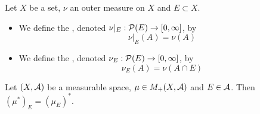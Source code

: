 \documentclass{book}
\begin{document}
	\begin{defn} 
		Let $X$ be a set, $\nu$ an outer measure on $X$ and $E \subset X$. 
		\begin{itemize}
			\item We define the , denoted $\nu|_E: \mathcal{P}(E) \rightarrow [0,\infty]$, by 
			$$\nu|_E(A) = \nu(A)$$
			\item We define the , denoted $\nu_E: \mathcal{P}(E) \rightarrow [0,\infty]$, by 
			$$\nu_E(A) = \nu(A \cap E)$$
		\end{itemize}
	\end{defn}
	
	\begin{ex}  
		Let $(X, \mathcal{A})$ be a measurable space, $\mu \in M_+(X, \mathcal{A})$ and $E\in \mathcal{A}$. Then $(\mu^*)_E = (\mu_E)^*$. 
	\end{ex}
	
\end{document}
